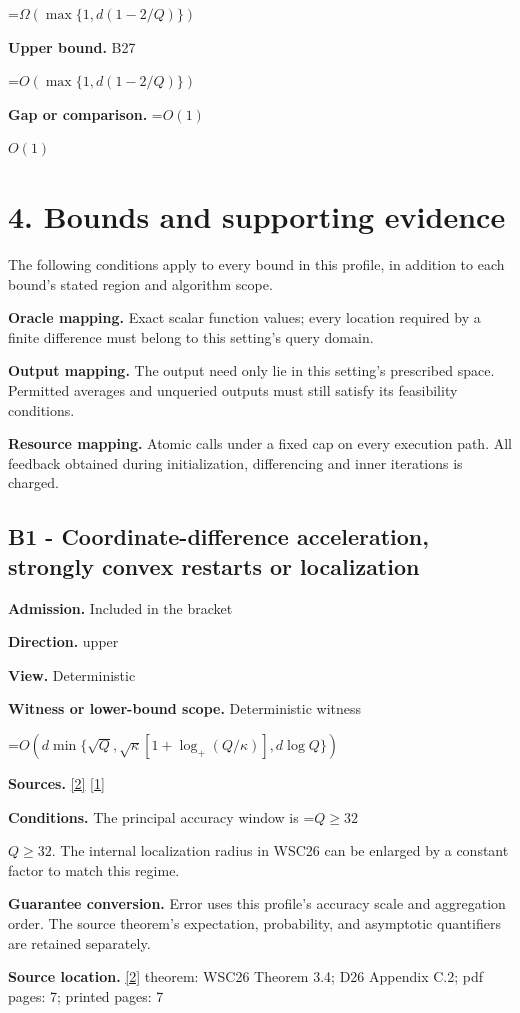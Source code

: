 \documentclass[10pt,a4paper]{article}
\newcommand{\AtlasMath}[1]{\par\begingroup\centering\setbox0=\hbox{$\displaystyle #1$}\ifdim\wd0>1.4\linewidth\typeout{ATLAS WIDE FORMULA: \the\wd0}\fi\ifdim\wd0>\linewidth\resizebox{\linewidth}{!}{\box0}\else\box0\fi\par\endgroup}
\newcommand{\AtlasInlineMath}[1]{\begingroup\setbox0=\hbox{$#1$}\ifdim\wd0>.4\linewidth\endgroup\AtlasMath{#1}\else\endgroup$#1$\fi}
\begin{document}
\AtlasMath{\Omega(\max\{1,d(1-2/Q)\})}
\textbf{Upper bound.} B27

\AtlasMath{O(\max\{1,d(1-2/Q)\})}
\textbf{Gap or comparison.} \AtlasInlineMath{O(1)}

\section{4. Bounds and supporting evidence}
The following conditions apply to every bound in this profile, in addition to each bound's stated region and algorithm scope.

\textbf{Oracle mapping.} Exact scalar function values; every location required by a finite difference must belong to this setting's query domain.

\textbf{Output mapping.} The output need only lie in this setting's prescribed space. Permitted averages and unqueried outputs must still satisfy its feasibility conditions.

\textbf{Resource mapping.} Atomic calls under a fixed cap on every execution path. All feedback obtained during initialization, differencing and inner iterations is charged.

\subsection{B1 - Coordinate-difference acceleration, strongly convex restarts or localization}
\textbf{Admission.} Included in the bracket

\textbf{Direction.} upper

\textbf{View.} Deterministic

\textbf{Witness or lower-bound scope.} Deterministic witness

\AtlasMath{O\!\left(d\min\{\sqrt Q,\sqrt\kappa[1+\log_+(Q/\kappa)],d\log Q\}\right)}
\textbf{Sources.} \href{https://arxiv.org/pdf/2609.18728v2}{[2]} \href{https://arxiv.org/html/2610.00345v1}{[1]}

\textbf{Conditions.} The principal accuracy window is \AtlasInlineMath{Q\ge32}. The internal localization radius in WSC26 can be enlarged by a constant factor to match this regime.

\textbf{Guarantee conversion.} Error uses this profile's accuracy scale and aggregation order. The source theorem's expectation, probability, and asymptotic quantifiers are retained separately.

\textbf{Source location.} \href{https://arxiv.org/pdf/2609.18728v2}{[2]} theorem: WSC26 Theorem 3.4; D26 Appendix C.2; pdf pages: 7; printed pages: 7
\end{document}

